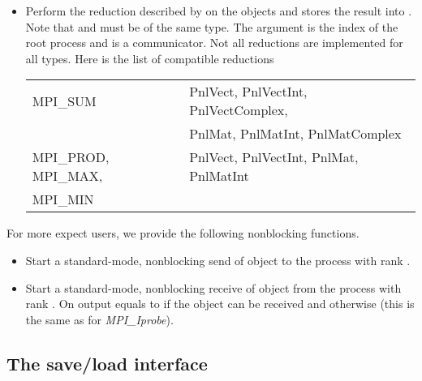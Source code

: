 \begin{itemize}
\item {}
  \sshortdescribe Perform the reduction described by  on
  the objects  and stores the result into . Note that
   and  must be of the same type. The argument
   is the index of the root process and  is a communicator.
  Not all reductions are implemented for all types. Here is the list of
  compatible reductions

  \begin{center}
  \begin{tabular}{l@{\hskip 1em}|@{\hskip 1em}l}

    MPI_SUM            & PnlVect, PnlVectInt, PnlVectComplex, \\
                       & PnlMat, PnlMatInt, PnlMatComplex \\
    \hline
    MPI_PROD, MPI_MAX, & PnlVect, PnlVectInt, PnlMat, PnlMatInt \\
    MPI_MIN            & 
  \end{tabular}
  \end{center}
\end{itemize}

For more expect users, we provide the following nonblocking functions.
\begin{itemize}
\item {}
  \sshortdescribe Start a standard-mode, nonblocking send of object
   to the process with rank .
  
  
\item {}
  \sshortdescribe Start a standard-mode, nonblocking receive of object
   from the process with rank . On output  equals
  to  if the object can be received and  otherwise (this
  is the same as for {\it MPI_Iprobe}).
\end{itemize}

\subsection{The save/load interface}

